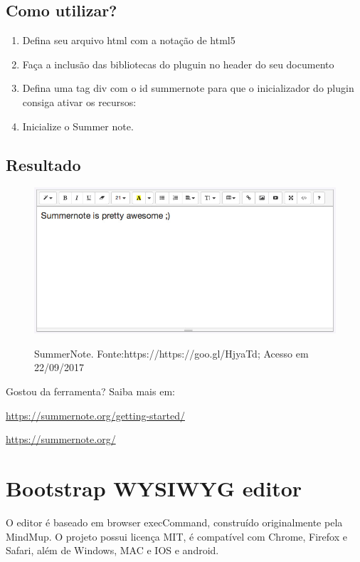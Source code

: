 \documentclass[12pt,a4paper]{article}
\begin{document}
\subsection{Como utilizar?}
\begin{enumerate}
\item Defina seu arquivo html com a notação de html5

\item Faça a inclusão das bibliotecas do pluguin no header do seu documento

\item Defina uma tag div com o id summernote para que o inicializador do plugin consiga ativar os recursos:

\item Inicialize o Summer note.

\end{enumerate}

\subsection{Resultado}

\begin{figure}[h]
\centering
\includegraphics[width=13cm]{recursos/SummerNote/SummerNote.jpg}
\label{3}
\caption{SummerNote. Fonte:https://https://goo.gl/HjyaTd; Acesso em 22/09/2017}
\end{figure}



Gostou da ferramenta? Saiba mais em:


\url{https://summernote.org/getting-started/}


\url{https://summernote.org/}

\section{Bootstrap WYSIWYG editor}
O editor é baseado em browser execCommand, construído originalmente pela MindMup. 
O projeto possui licença MIT, é compatível com Chrome, Firefox e Safari, além de Windows, MAC e IOS e android.
\end{document}
